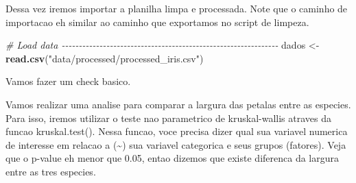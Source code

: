 \documentclass[
]{book}
\newenvironment{Shaded}{\begin{snugshade}}{\end{snugshade}}
\newcommand{\CommentTok}[1]{\textcolor[rgb]{0.56,0.35,0.01}{\textit{#1}}}
\newcommand{\FunctionTok}[1]{\textcolor[rgb]{0.13,0.29,0.53}{\textbf{#1}}}
\newcommand{\NormalTok}[1]{#1}
\newcommand{\OtherTok}[1]{\textcolor[rgb]{0.56,0.35,0.01}{#1}}
\newcommand{\SpecialCharTok}[1]{\textcolor[rgb]{0.81,0.36,0.00}{\textbf{#1}}}
\newcommand{\StringTok}[1]{\textcolor[rgb]{0.31,0.60,0.02}{#1}}
\begin{document}
Dessa vez iremos importar a planilha limpa e processada. Note que o caminho de importacao eh similar ao caminho que exportamos no script de limpeza.

\begin{Shaded}
\begin{Highlighting}[]

\CommentTok{\# Load data {-}{-}{-}{-}{-}{-}{-}{-}{-}{-}{-}{-}{-}{-}{-}{-}{-}{-}{-}{-}{-}{-}{-}{-}{-}{-}{-}{-}{-}{-}{-}{-}{-}{-}{-}{-}{-}{-}{-}{-}{-}{-}{-}{-}{-}{-}{-}{-}{-}{-}{-}{-}{-}{-}{-}{-}{-}{-}{-}{-}{-}{-}{-}}
\NormalTok{dados }\OtherTok{\textless{}{-}} \FunctionTok{read.csv}\NormalTok{(}\StringTok{"data/processed/processed\_iris.csv"}\NormalTok{)}
\end{Highlighting}
\end{Shaded}

Vamos fazer um check basico.

\begin{Shaded}
\end{Shaded}

Vamos realizar uma analise para comparar a largura das petalas entre as especies. Para isso, iremos utilizar o teste nao parametrico de kruskal-wallis atraves da funcao kruskal.test(). Nessa funcao, voce precisa dizer qual sua variavel numerica de interesse em relacao a (\textasciitilde) sua variavel categorica e seus grupos (fatores). Veja que o p-value eh menor que 0.05, entao dizemos que existe diferenca da largura entre as tres especies.

\begin{Shaded}
\end{Shaded}
\end{document}

